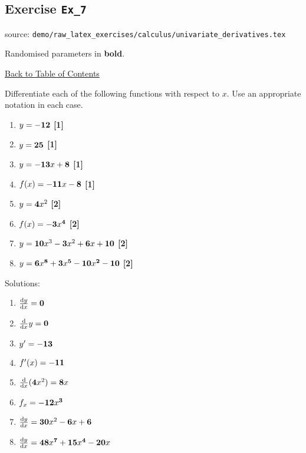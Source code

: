 \documentclass[a4paper, leqno, 12pt]{report}
\newenvironment{top_enumerate}{
\begin{enumerate}
  \setlength{\itemsep}{2em}
  \setlength{\topsep}{-0pt}
  \setlength{\partopsep}{-0pt}
}{\end{enumerate}}
\begin{document}
\subsection{Exercise \texttt{Ex\_7}}
source: \texttt{demo/raw\_latex\_exercises/calculus/univariate\_derivatives.tex}

Randomised parameters in \textbf{bold}. 

\hyperlink{contents}{Back to Table of Contents}
\begin{top_enumerate}
\item Differentiate each of the following functions with respect to $x$. Use an appropriate notation in each case.
 
\setcounter{equation}{0}  %
\begin{multicols}{2}
\begin{enumerate}
	\setlength{\topsep}{-0pt}
	\setlength{\partopsep}{-0pt}
	\setlength{\itemsep}{10pt}
			\item $y = {\bf -12}$
	 \quad \textbf{[1]}
		\item $y = {\bf 25}$
	 \quad \textbf{[1]}
		\item $y = {\bf -13}x+{\bf 8}$
	 \quad \textbf{[1]}
		\item $f(x) = {\bf -11}x-{\bf 8}$
	 \quad \textbf{[1]}
		\item $y = {\bf 4}x^2$
	 \quad \textbf{[2]}
		\item $f(x)={\bf -3}x^{\bf 4}$
	 \quad \textbf{[2]}
		\item $y = {\bf 10}x^3 - {\bf 3}x^2 + {\bf 6}x + {\bf 10}$
	 \quad \textbf{[2]}
		\item $y = {\bf 6}x^{\bf 8} + {\bf 3}x^{\bf 5} - {\bf 10}x^{\bf 2} - {\bf 10}$
	 \quad \textbf{[2]}
\end{enumerate}\end{multicols}\addtocounter{enumi}{-1}
\item Solutions:
 
\setcounter{equation}{0}  %
\begin{multicols}{2}
\begin{enumerate}
	\setlength{\topsep}{-0pt}
	\setlength{\partopsep}{-0pt}
	\setlength{\itemsep}{10pt}
			\item $\frac{\textrm{d}y}{\textrm{d}x}={{\bf 0}}$
	 \quad \textbf{}
		\item $\frac{\textrm{d}}{\textrm{d}x}y={{\bf 0}}$
	 \quad \textbf{}
		\item $y'={{\bf -13}}$
	 \quad \textbf{}
		\item $f'(x)={{\bf -11}}$
	 \quad \textbf{}
		\item $\frac{\textrm{d}}{\textrm{d}x}({\bf 4}x^2)={{\bf 8}x}$
	 \quad \textbf{}
		\item $f_x={{\bf -12}x^{\bf 3}}$
	 \quad \textbf{}
		\item $\frac{\textrm{d}y}{\textrm{d}x}={{\bf 30}x^2 - {\bf 6}x + {\bf 6}}$
	 \quad \textbf{}
		\item $\frac{\textrm{d}y}{\textrm{d}x}={{\bf 48}x^{\bf 7} + {\bf 15}x^{\bf 4} - {\bf 20}x}$
	 \quad \textbf{}
\end{enumerate}\end{multicols}\newpage
\end{top_enumerate}
\end{document}
